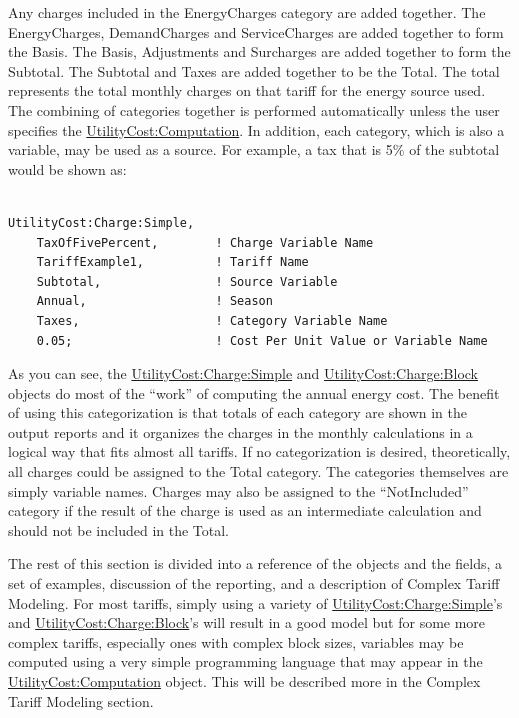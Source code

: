Any charges included in the EnergyCharges category are added together. The EnergyCharges, DemandCharges and ServiceCharges are added together to form the Basis. The Basis, Adjustments and Surcharges are added together to form the Subtotal. The Subtotal and Taxes are added together to be the Total. The total represents the total monthly charges on that tariff for the energy source used. The combining of categories together is performed automatically unless the user specifies the \hyperref[utilitycostcomputation]{UtilityCost:Computation}. In addition, each category, which is also a variable, may be used as a source. For example, a tax that is 5\% of the subtotal would be shown as:

\begin{lstlisting}

UtilityCost:Charge:Simple,
    TaxOfFivePercent,        ! Charge Variable Name
    TariffExample1,          ! Tariff Name
    Subtotal,                ! Source Variable
    Annual,                  ! Season
    Taxes,                   ! Category Variable Name
    0.05;                    ! Cost Per Unit Value or Variable Name
\end{lstlisting}

As you can see, the \hyperref[utilitycostchargesimple]{UtilityCost:Charge:Simple} and \hyperref[utilitycostchargeblock]{UtilityCost:Charge:Block} objects do most of the ``work'' of computing the annual energy cost. The benefit of using this categorization is that totals of each category are shown in the output reports and it organizes the charges in the monthly calculations in a logical way that fits almost all tariffs. If no categorization is desired, theoretically, all charges could be assigned to the Total category. The categories themselves are simply variable names. Charges may also be assigned to the ``NotIncluded'' category if the result of the charge is used as an intermediate calculation and should not be included in the Total.

The rest of this section is divided into a reference of the objects and the fields, a set of examples, discussion of the reporting, and a description of Complex Tariff Modeling. For most tariffs, simply using a variety of \hyperref[utilitycostchargesimple]{UtilityCost:Charge:Simple}'s and \hyperref[utilitycostchargeblock]{UtilityCost:Charge:Block}'s will result in a good model but for some more complex tariffs, especially ones with complex block sizes, variables may be computed using a very simple programming language that may appear in the \hyperref[utilitycostcomputation]{UtilityCost:Computation} object. This will be described more in the Complex Tariff Modeling section.